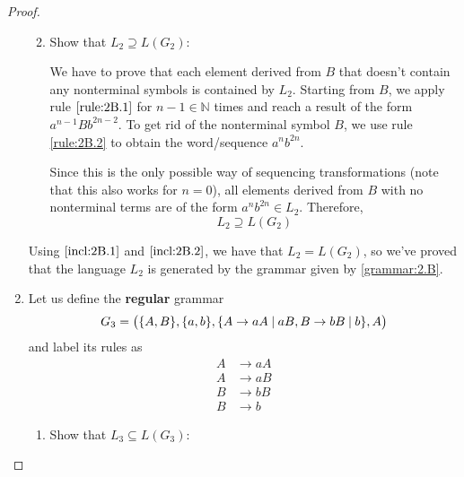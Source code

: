 \documentclass[11pt]{article}
\begin{document}
\begin{proof}
\begin{enumerate}
\begin{enumerate}
            \vspace{1em}

            \item Show that $L_2 \supseteq L(G_2)$:

            We have to prove that each element derived from $B$ that doesn't contain
            any nonterminal symbols is contained by $L_2$. Starting from $B$, we apply
            rule $\eqref{rule:2B.1}$ for $n - 1 \in \mathbb{N}$ times and reach a result
            of the form $a^{n - 1}Bb^{2n - 2}$. To get rid of the nonterminal symbol $B$, we use
            rule \eqref{rule:2B.2} to obtain the word/sequence $a^nb^{2n}$.

            Since this is the only possible way of sequencing transformations (note that
            this also works for $n=0$), all elements derived from $B$ with no
            nonterminal terms are of the form $a^nb^{2n} \in L_2$. Therefore, 
            \begin{equation}\label{incl:2B.2}
            L_2 \supseteq L(G_2) 
            \end{equation}
        \end{enumerate}
        Using $\eqref{incl:2B.1}$ and $\eqref{incl:2B.2}$, we have that $L_2 = L(G_2)$, so
        we've proved that the language $L_2$ is generated by the grammar given by \eqref{grammar:2.B}.

        \vspace{1em}

        \item Let us define the \textbf{regular} grammar 
            \begin{equation}\label{grammar:2.C}
                G_3 = \big(\{A, B\}, \{a, b\}, 
                \{A \to aA \hspace{0.25em}|\hspace{0.25em} aB, 
                B \to bB \hspace{0.25em}|\hspace{0.25em} b\}, A\big)
            \end{equation}
        and label its rules as
        \begin{align}
            A &\to aA \label{rule:2C.1} \\
            A &\to aB \label{rule:2C.2} \\
            B &\to bB \label{rule:2C.3} \\
            B &\to b \label{rule:2C.4}
        \end{align}
        \begin{enumerate}
            \item Show that $L_3 \subseteq L(G_3)$:


\end{enumerate}
\end{enumerate}
\end{proof}
\end{document}
